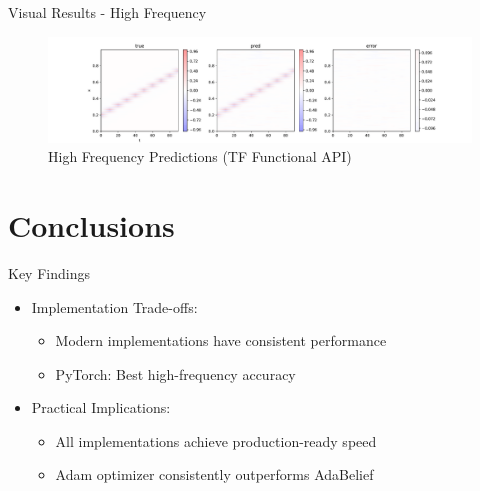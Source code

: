 \documentclass{beamer}
\begin{document}
\begin{frame}{Visual Results - High Frequency}
    \begin{figure}
        \includegraphics[width=\textwidth]{functional/high-frequency-adam-20250206-1520-1/vis}
        \caption{High Frequency Predictions (TF Functional API)}
    \end{figure}
\end{frame}

\section{Conclusions}
\begin{frame}{Key Findings}
    \begin{itemize}
        \item Implementation Trade-offs:
        \begin{itemize}
            \item Modern implementations have consistent performance
            \item PyTorch: Best high-frequency accuracy
        \end{itemize}
        \item Practical Implications:
        \begin{itemize}
            \item All implementations achieve production-ready speed
            \item Adam optimizer consistently outperforms AdaBelief
        \end{itemize}
    \end{itemize}
\end{frame}
\end{document}
